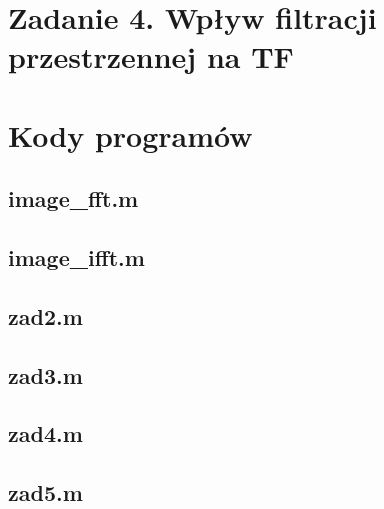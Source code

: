 





 


\section*{Zadanie 4. Wpływ filtracji przestrzennej na TF}












\newpage \section*{Kody programów}

\subsection*{image\_fft.m     }
\subsection*{image\_ifft.m    } \newpage
\subsection*{zad2.m           } \newpage
\subsection*{zad3.m           } \newpage
\subsection*{zad4.m           } \newpage
\subsection*{zad5.m           } \newpage










